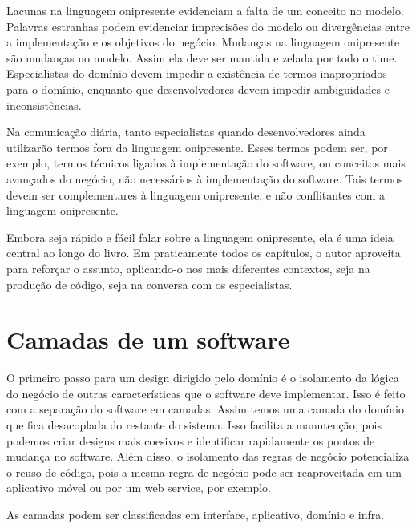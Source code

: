 \documentclass[a4paper, 12pt]{article}
\newcommand{\lgg}{linguagem onipresente\xspace}
\begin{document}
Lacunas na linguagem onipresente evidenciam a falta de um conceito no modelo. Palavras estranhas podem evidenciar imprecisões do modelo ou divergências entre a implementação e os objetivos do negócio. Mudanças na linguagem onipresente são mudanças no modelo. Assim ela deve ser mantida e zelada por todo o time. Especialistas do domínio devem impedir a existência de termos inapropriados para o domínio, enquanto que desenvolvedores devem impedir ambiguidades e inconsistências.

Na comunicação diária, tanto especialistas quando desenvolvedores ainda utilizarão termos fora da linguagem onipresente. Esses termos podem ser, por exemplo, termos técnicos ligados à implementação do software, ou conceitos mais avançados do negócio, não necessários à implementação do software. Tais termos devem ser complementares à linguagem onipresente, e não conflitantes com a linguagem onipresente.

Embora seja rápido e fácil falar sobre a \lgg, ela é uma ideia central ao longo do livro. Em praticamente todos os capítulos, o autor aproveita para reforçar o assunto, aplicando-o nos mais diferentes contextos, seja na produção de código, seja na conversa com os especialistas.


\section{Camadas de um software}

O primeiro passo para um design dirigido pelo domínio é o isolamento da lógica do negócio de outras características que o software deve implementar. Isso é feito com a separação do software em camadas. Assim temos uma camada do domínio que fica desacoplada do restante do sistema. Isso facilita a manutenção, pois podemos criar designs mais coesivos e identificar rapidamente os pontos de mudança no software. Além disso, o isolamento das regras de negócio potencializa o reuso de código, pois a mesma regra de negócio pode ser reaproveitada em um aplicativo móvel ou por um web service, por exemplo.

As camadas podem ser classificadas em interface, aplicativo, domínio e infra.
\end{document}
